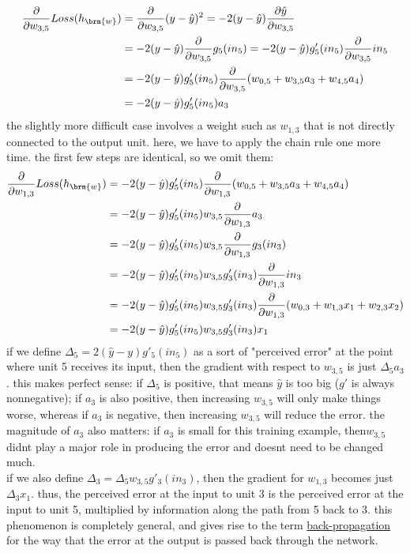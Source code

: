 \documentclass[a4paper,12pt]{article}
\begin{document}
\begin{align*}
  \frac{\partial}{\partial w_{3,5}}Loss(h_{\brm{w}}) &= \frac{\partial}{\partial w_{3,5}}(y-\hat y)^2 = -2(y-\hat y)\frac{\partial \hat y}{\partial w_{3,5}}\\
  &= -2(y-\hat y)\frac{\partial}{\partial w_{3,5}}g_5(in_5) = -2(y-\hat y)g'_5(in_5)\frac{\partial}{\partial w_{3,5}}in_5\\
  &= -2(y-\hat y)g'_5(in_5)\frac{\partial}{\partial w_{3,5}}(w_{0,5}+w_{3,5}a_3+w_{4,5}a_4)\\
  &= -2(y-\hat y)g'_5(in_5)a_3
\end{align*}
the slightly more difficult case involves a weight such as \(w_{1,3}\) that is not directly connected to the output unit. here, we have to apply the chain rule one more time. the first few steps are identical, so we omit them:\\
\begin{align*}
  \frac{\partial}{\partial w_{1,3}}Loss(h_{\brm{w}}) &= -2(y-\hat y)g'_5(in_5)\frac{\partial}{\partial w_{1,3}}(w_{0,5}+w_{3,5}a_3+w_{4,5}a_4)\\
  &= -2(y-\hat y)g'_5(in_5)w_{3,5}\frac{\partial}{\partial w_{1,3}}a_3\\
  &= -2(y-\hat y)g'_5(in_5)w_{3,5}\frac{\partial}{\partial w_{1,3}}g_3(in_3)\\
  &= -2(y-\hat y)g'_5(in_5)w_{3,5}g'_3(in_3)\frac{\partial}{\partial w_{1,3}}in_3\\
  &= -2(y-\hat y)g'_5(in_5)w_{3,5}g'_3(in_3)\frac{\partial}{\partial w_{1,3}}(w_{0,3}+w_{1,3}x_1+w_{2,3}x_2)\\
  &= -2(y-\hat y)g'_5(in_5)w_{3,5}g'_3(in_3)x_1
\end{align*}
if we define \(\Delta_5=2(\hat y-y)g'_5(in_5)\) as a sort of "perceived error" at the point where unit 5 receives its input, then the gradient with respect to \(w_{3,5}\) is just \(\Delta_5a_3\). this makes perfect sense: if \(\Delta_5\) is positive, that means \(\hat y\) is too big (\(g'\) is always nonnegative); if \(a_3\) is also positive, then increasing \(w_{3,5}\) will only make things worse, whereas if \(a_3\) is negative, then increasing \(w_{3,5}\) will reduce the error. the magnitude of \(a_3\) also matters: if \(a_3\) is small for this training example, then\(w_{3,5}\) didnt play a major role in producing the error and doesnt need to be changed much.\\
if we also define \(\Delta_3=\Delta_5w_{3,5}g'_3(in_3)\), then the gradient for \(w_{1,3}\) becomes just \(\Delta_3x_1\). thus, the perceived error at the input to unit 3 is the perceived error at the input to unit 5, multiplied by information along the path from 5 back to 3. this phenomenon is completely general, and gives rise to the term \href{20230503165849-backpropagation.org}{back-propagation} for the way that the error at the output is passed back through the network.\\
\end{document}
